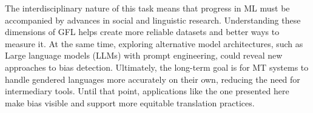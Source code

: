    The interdisciplinary nature of this task means that progress in ML must be accompanied by advances in social and linguistic research. Understanding these dimensions of GFL helps create more reliable datasets and better ways to measure it. At the same time, exploring alternative model architectures, such as Large language models (LLMs) with prompt engineering, could reveal new approaches to bias detection. Ultimately, the long-term goal is for MT systems to handle gendered languages more accurately on their own, reducing the need for intermediary tools. Until that point, applications like the one presented here make bias visible and support more equitable translation practices.
